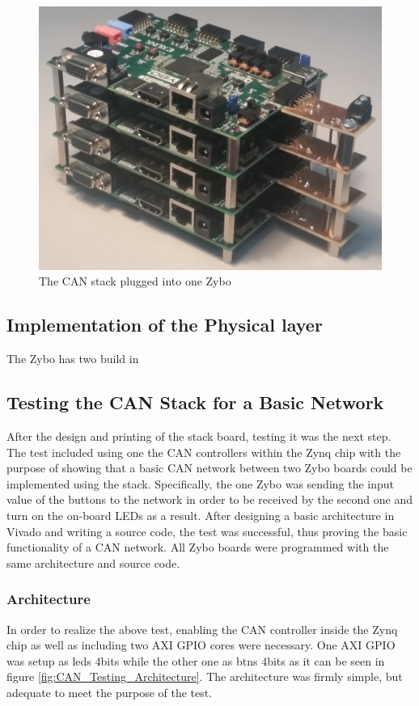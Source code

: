 \begin{figure}[H]
	\centering
	\includegraphics[width = 0.9\linewidth]{graphics/CAN_stack_picture}
	\caption{The CAN stack plugged into one Zybo}
	\label{fig:CAN_stack_picture}
\end{figure}

\subsection{Implementation of the Physical layer}\label{sub:CANphys_implementation}
The Zybo has two build in

\subsection{Testing the CAN Stack for a Basic Network}
After the design and printing of the stack board, testing it was the next step.
The test included using one the CAN controllers within the Zynq chip with the purpose of showing that a basic CAN network between two Zybo boards could be implemented using the stack.
Specifically, the one Zybo was sending the input value of the buttons to the network in order to be received by the second one and turn on the on-board LEDs as a result.
After designing a basic architecture in Vivado and writing a source code, the test was successful, thus proving the basic functionality of a CAN network.
All Zybo boards were programmed with the same architecture and source code.

\subsubsection{Architecture}
In order to realize the above test, enabling the CAN controller inside the Zynq chip as well as including two AXI GPIO cores were necessary.
One AXI GPIO was setup as leds 4bits while the other one as btns 4bits as it can be seen in figure \ref{fig:CAN_Testing_Architecture}. The architecture was firmly simple, but adequate to meet the purpose of the test.

